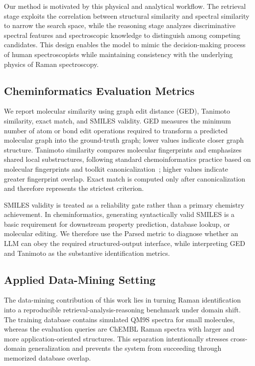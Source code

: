 \documentclass[conference]{IEEEtran}
\begin{document}
Our method is motivated by this physical and analytical workflow. The retrieval stage exploits the correlation between structural similarity and spectral similarity to narrow the search space, while the reasoning stage analyzes discriminative spectral features and spectroscopic knowledge to distinguish among competing candidates. This design enables the model to mimic the decision-making process of human spectroscopists while maintaining consistency with the underlying physics of Raman spectroscopy.

\subsection{Cheminformatics Evaluation Metrics}

We report molecular similarity using graph edit distance (GED), Tanimoto similarity, exact match, and SMILES validity. GED measures the minimum number of atom or bond edit operations required to transform a predicted molecular graph into the ground-truth graph; lower values indicate closer graph structure. Tanimoto similarity compares molecular fingerprints and emphasizes shared local substructures, following standard chemoinformatics practice based on molecular fingerprints and toolkit canonicalization~\cite{landrum2013rdkit}; higher values indicate greater fingerprint overlap. Exact match is computed only after canonicalization and therefore represents the strictest criterion.

SMILES validity is treated as a reliability gate rather than a primary chemistry achievement. In cheminformatics, generating syntactically valid SMILES is a basic requirement for downstream property prediction, database lookup, or molecular editing. We therefore use the Parsed metric to diagnose whether an LLM can obey the required structured-output interface, while interpreting GED and Tanimoto as the substantive identification metrics.

\subsection{Applied Data-Mining Setting}

The data-mining contribution of this work lies in turning Raman identification into a reproducible retrieval-analysis-reasoning benchmark under domain shift. The training database contains simulated QM9S spectra for small molecules, whereas the evaluation queries are ChEMBL Raman spectra with larger and more application-oriented structures. This separation intentionally stresses cross-domain generalization and prevents the system from succeeding through memorized database overlap.
\end{document}
